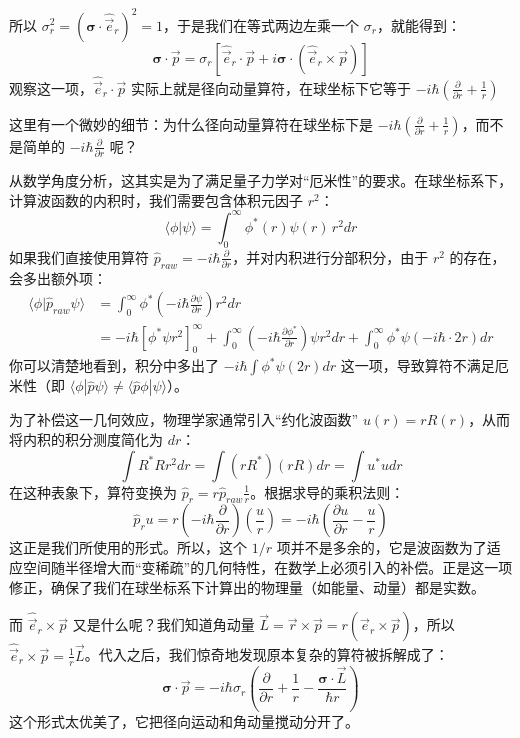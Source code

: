 \documentclass[UTF8]{ctexbook}
\begin{document}
所以 $\sigma_r^2 = (\boldsymbol{\sigma}\cdot\hat{\vec{e}}_r)^2 = 1$，于是我们在等式两边左乘一个 $\sigma_r$，就能得到：
\[
\boldsymbol{\sigma} \cdot \vec{p} = \sigma_r \left[ \hat{\vec{e}}_r \cdot \vec{p} + i \boldsymbol{\sigma} \cdot (\hat{\vec{e}}_r \times \vec{p}) \right]
\]
观察这一项，$\hat{\vec{e}}_r \cdot \vec{p}$ 实际上就是径向动量算符，在球坐标下它等于 $-i\hbar (\frac{\partial}{\partial r} + \frac{1}{r})$

这里有一个微妙的细节：为什么径向动量算符在球坐标下是 $-i\hbar (\frac{\partial}{\partial r} + \frac{1}{r})$，而不是简单的 $-i\hbar \frac{\partial}{\partial r}$ 呢？

从数学角度分析，这其实是为了满足量子力学对“厄米性”的要求。在球坐标系下，计算波函数的内积时，我们需要包含体积元因子 $r^2$：
\[ \langle \phi | \psi \rangle = \int_0^\infty \phi^*(r) \psi(r) \, r^2 dr \]
如果我们直接使用算符 $\hat{p}_{raw} = -i\hbar \frac{\partial}{\partial r}$，并对内积进行分部积分，由于 $r^2$ 的存在，会多出额外项：
\begin{align*}
\langle \phi | \hat{p}_{raw} \psi \rangle &= \int_0^\infty \phi^* \left( -i\hbar \frac{\partial \psi}{\partial r} \right) r^2 dr \\
&= -i\hbar \left[ \phi^* \psi r^2 \right]_0^\infty + \int_0^\infty \left( -i\hbar \frac{\partial \phi^*}{\partial r} \right) \psi r^2 dr + \int_0^\infty \phi^* \psi (-i\hbar \cdot 2r) dr
\end{align*}
你可以清楚地看到，积分中多出了 $-i\hbar \int \phi^* \psi (2r) dr$ 这一项，导致算符不满足厄米性（即 $\langle \phi | \hat{p} \psi \rangle \neq \langle \hat{p} \phi | \psi \rangle$）。

为了补偿这一几何效应，物理学家通常引入“约化波函数” $u(r) = rR(r)$，从而将内积的积分测度简化为 $dr$：
\[ \int R^* R r^2 dr = \int (rR^*)(rR) dr = \int u^* u dr \]
在这种表象下，算符变换为 $\hat{p}_r = r \hat{p}_{raw} \frac{1}{r}$。根据求导的乘积法则：
\[ \hat{p}_r u = r \left( -i\hbar \frac{\partial}{\partial r} \right) \left( \frac{u}{r} \right) = -i\hbar \left( \frac{\partial u}{\partial r} - \frac{u}{r} \right) \]
这正是我们所使用的形式。所以，这个 $1/r$ 项并不是多余的，它是波函数为了适应空间随半径增大而“变稀疏”的几何特性，在数学上必须引入的补偿。正是这一项修正，确保了我们在球坐标系下计算出的物理量（如能量、动量）都是实数。

而 $\hat{\vec{e}}_r \times \vec{p}$ 又是什么呢？我们知道角动量 $\vec{L} = \vec{r} \times \vec{p} = r(\hat{\vec{e}}_r \times \vec{p})$，所以 $\hat{\vec{e}}_r \times \vec{p} = \frac{1}{r}\vec{L}$。代入之后，我们惊奇地发现原本复杂的算符被拆解成了：
\[
\boldsymbol{\sigma} \cdot \vec{p} = -i\hbar \sigma_r \left( \frac{\partial}{\partial r} + \frac{1}{r} - \frac{\boldsymbol{\sigma} \cdot \vec{L}}{\hbar r} \right)
\]
这个形式太优美了，它把径向运动和角动量搅动分开了。
\end{document}

